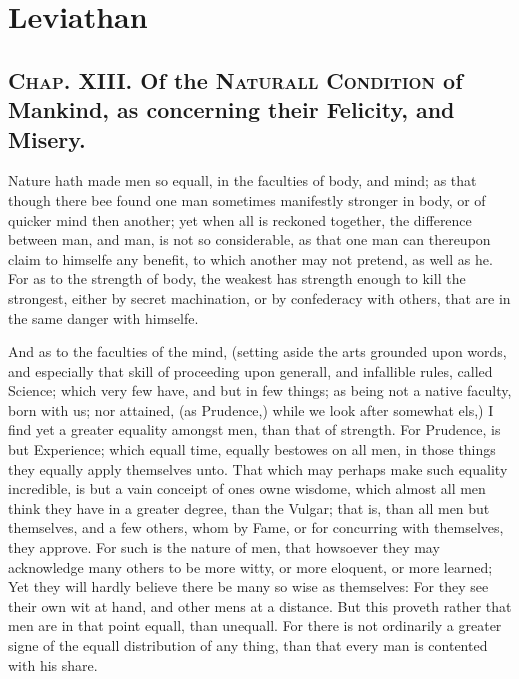 
\author{Thomas Hobbes}
\chapter[Leviathan, chaps. 13 and 17]{Leviathan}

\section*{\textsc{Chap}. XIII. Of the \textsc{Naturall
Condition} of Mankind, as concerning their Felicity, and Misery.}

Nature hath made men so equall, in the faculties of body, and mind; as
that though there bee found one man sometimes manifestly stronger in
body, or of quicker mind then another; yet when all is reckoned
together, the difference between man, and man, is not so considerable,
as that one man can thereupon claim to himselfe any benefit, to which
another may not pretend, as well as he. For as to the strength of
body, the weakest has strength enough to kill the strongest, either by
secret machination, or by confederacy with others, that are in the
same danger with himselfe.

And as to the faculties of the mind, (setting aside the arts
grounded upon words, and especially that skill of proceeding upon
generall, and infallible rules, called Science; which very few have,
and but in few things; as being not a native faculty, born with us;
nor attained, (as Prudence,) while we look after somewhat els,) I find
yet a greater equality amongst men, than that of strength. For
Prudence, is but Experience; which equall time, equally bestowes on
all men, in those things they equally apply themselves unto. That
which may perhaps make such equality incredible, is but a vain
conceipt of ones owne wisdome, which almost all men think they have
in a greater degree, than the Vulgar; that is, than all men but
themselves, and a few others, whom by Fame, or for concurring with
themselves, they approve. For such is the nature of men, that
howsoever they may acknowledge many others to be more witty, or more
eloquent, or more learned; Yet they will hardly believe there be many
so wise as themselves: For they see their own wit at hand, and other
mens at a distance. But this proveth rather that men are in that
point equall, than unequall. For there is not ordinarily a greater
signe of the equall distribution of any thing, than that every man is
contented with his share.


